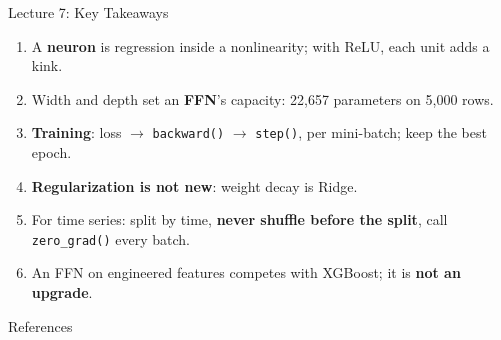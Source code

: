 \documentclass[aspectratio=169, 11pt]{beamer}
\begin{document}
\begin{frame}{Lecture 7: Key Takeaways}
  \begin{keybox}
    {\footnotesize
    \begin{enumerate}\itemsep2pt
      \item A \textbf{neuron} is regression inside a nonlinearity; with ReLU, each unit adds a
            kink.

      \item Width and depth set an \textbf{FFN}'s capacity: 22{,}657 parameters on 5{,}000
            rows.

      \item \textbf{Training}: loss $\to$ \texttt{backward()} $\to$ \texttt{step()}, per
            mini-batch; keep the best epoch.

      \item \textbf{Regularization is not new}: weight decay is Ridge.

      \item For time series: split by time, \textbf{never shuffle before the split}, call
            \texttt{zero\_grad()} every batch.

      \item An FFN on engineered features competes with XGBoost; it is \textbf{not an upgrade}.
    \end{enumerate}
    }
  \end{keybox}
\end{frame}

\begin{frame}[allowframebreaks]{References}
  \printbibliography[heading=none]
\end{frame}

\end{document}
